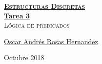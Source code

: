 \documentclass[12pt, fleqn]{article}                            %
\author{Oscar Andrés Rosas}                                     %
\theoremstyle{break}                                            %
\begin{document}
\begin{titlepage}
    
    \pagecolor{TitlePageColor}                                      %
    \color{white}                                                   %

    \vspace                                                         %
    \baselineskip                                                   %

    \makebox[0pt][l]{\rule{1.3\textwidth}{3pt}}                     %
    
    \href{https://compilandoconocimiento.com}                       %
    {\textbf{\textsc{\Huge Estructuras Discretas}}}\\[2.7cm]      %

    \href{\ProjectNameLink}                                         %
    {\fontsize{45}{52}\selectfont \textbf{Tarea 3}}\\[0.5cm]        %
    \textcolor{ColorSubtext}{\textsc{\Huge Lógica de predicados}}   %
    
    \vfill                                                          %
    
    \href{\ProjectAuthorLink}                                       %
    {\LARGE \textsf{Oscar Andrés Rosas Hernandez}}                  %

    \vspace                                                         %
    \baselineskip                                                   %
    
    {\large \textsf{Octubre 2018}}                                  %

\end{titlepage}
\end{document}
